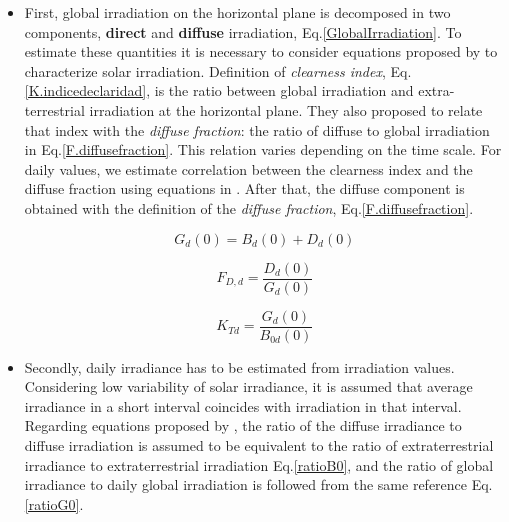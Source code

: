 \begin{itemize}
\item First, global irradiation on the horizontal plane is decomposed in two components, \textbf{direct} and \textbf{diffuse} irradiation, Eq.\ref{GlobalIrradiation}. To estimate these quantities it is necessary to consider equations proposed by \cite{Liu1960} to characterize solar irradiation. Definition of \textit{clearness index}, Eq.\ref{K.indicedeclaridad}, is the ratio between global irradiation and extra-terrestrial irradiation at the horizontal plane. They also proposed to relate that index with the \textit{diffuse fraction}: the ratio of diffuse to global irradiation in Eq.\ref{F.diffusefraction}. This relation varies depending on the time scale. For daily values, we estimate correlation between the clearness index and the diffuse fraction using equations in \cite{Aguiar1992}. After that, the diffuse component is obtained with the definition of the \textit{diffuse fraction}, Eq.\ref{F.diffusefraction}.

\begin{equation}\label{GlobalIrradiation}
G_{d}(0) = B_{d}(0) + D_{d}(0)
\end{equation}



\begin{equation}\label{F.diffusefraction}
F_{D,d}=\frac{D_{d}(0)}{G_{d}(0)}
\end{equation}

\begin{equation}\label{K.indicedeclaridad}
K_{Td}=\frac{G_d(0)}{B_{0d}(0)}
\end{equation}

\item Secondly, daily irradiance has to be estimated from irradiation values. Considering low variability of solar irradiance, it is assumed that average irradiance in a short interval coincides with irradiation in that interval. Regarding equations proposed by \cite{Aguiar1992}, the ratio of the diffuse irradiance to diffuse irradiation is assumed to be equivalent to the ratio of extraterrestrial irradiance to extraterrestrial irradiation Eq.\ref{ratioB0}, and the ratio of global irradiance to daily global irradiation is followed from the same reference Eq.\ref{ratioG0}. 


\end{itemize}
